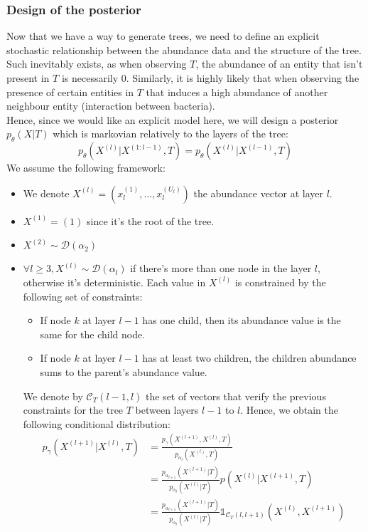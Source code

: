 \subsubsection{Design of the posterior}

Now that we have a way to generate trees, we need to define an explicit stochastic relationship between the abundance
data and the structure of the tree.
Such inevitably exists, as when observing $T$, the abundance of an entity that isn't present in $T$ is necessarily 0.
Similarly, it is highly likely that when observing the presence of certain entities in $T$ that induces a high abundance of
another neighbour entity (interaction between bacteria). \\

Hence, since we would like an explicit model here, we will design a posterior $p_{\theta}(X|T)$ which is markovian relatively to the layers of the tree:
$$
p_{\theta}(X^{(l)} | X^{(1:l-1)}, T) = p_{\theta}(X^{(l)} | X^{(l-1)}, T)
$$
We assume the following framework:
\begin{itemize}
    \item We denote $X^{(l)} = (x_l^{(1)}, \dots, x_{l}^{(U_l)})$ the abundance vector at layer $l$.
    \item $X^{(1)} = (1)$ since it's the root of the tree.
    \item $X^{(2)} \sim \mathcal{D}(\alpha_2)$
    \item $\forall l \geq 3, X^{(l)} \sim \mathcal{D}(\alpha_l)$ if there's more than one node in the layer $l$, otherwise it's deterministic.
        Each value in $X^{(l)}$ is constrained by the following set of constraints:
        \begin{itemize}
              \item If node $k$ at layer $l-1$ has one child, then its abundance value is the same for the child node.
              \item If node $k$ at layer $l-1$ has at least two children, the children abundance sums to the parent's abundance value.
        \end{itemize}
        We denote by $\mathcal{C}_T(l-1, l)$ the set of vectors that verify the previous constraints for the tree $T$ between layers $l-1$ to $l$.
        Hence, we obtain the following conditional distribution:
        $$
        \begin{align}
            p_{\gamma}(X^{(l+1)} | X^{(l)}, T) &= \frac{p_{\gamma}(X^{(l+1)}, X^{(l)}, T)}{p_{\alpha_l}(X^{(l)}, T)} \\
                                            &= \frac{p_{\alpha_{l+1}}(X^{(l+1)} | T)}{p_{\alpha_{l}}(X^{(l)} | T)} p(X^{(l)} | X^{(l+1)}, T) \\
                                            &= \frac{p_{\alpha_{l+1}}(X^{(l+1)} | T)}{p_{\alpha_{l}}(X^{(l)} | T)} \mathds{1}_{\mathcal{C}_T(l, l+1)}\left(X^{(l)}, X^{(l+1)}\right)
        \end{align}
        $$
\end{itemize}